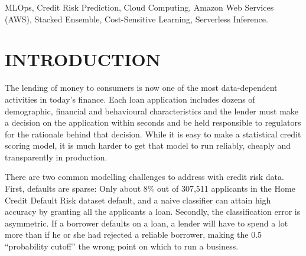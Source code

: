 \documentclass[conference]{IEEEtran}
\begin{document}
\maketitle

\begin{abstract}
Accurate credit risk models are easy to build offline, but real-world lending also demands cost-aware decisions, real-time feature reconstruction and full audit traceability. This paper presents CreditIQ, an end-to-end credit risk prediction platform built on Amazon Web Services (AWS) and evaluated on the Home Credit Default Risk dataset. Raw data is stored in Amazon S3, explored with Amazon Athena and preprocessed by AWS Glue under AWS Step Functions orchestration. A stacked ensemble of Logistic Regression, Random Forest, XGBoost and LightGBM achieves a held-out ROC-AUC of 0.7556, and a business cost matrix that penalises false approvals far more than false rejections sets its decision threshold at 0.49. The model is hosted on an Amazon SageMaker serverless endpoint, served through Amazon CloudFront, API Gateway and AWS Lambda, and every decision is logged to Amazon DynamoDB under AWS IAM and Amazon CloudWatch governance. The cloud deployment exactly matched the predictions of the local baseline, achieved 100\% request success rate, and had a median server-side latency of just 27 ms --- a realistic example of cost-aware financial MLOps.
\end{abstract}

\begin{IEEEkeywords}
MLOps, Credit Risk Prediction, Cloud Computing, Amazon Web Services (AWS), Stacked Ensemble, Cost-Sensitive Learning, Serverless Inference.
\end{IEEEkeywords}

\section{INTRODUCTION}
The lending of money to consumers is now one of the most data-dependent activities in today's finance. Each loan application includes dozens of demographic, financial and behavioural characteristics and the lender must make a decision on the application within seconds and be held responsible to regulators for the rationale behind that decision. While it is easy to make a statistical credit scoring model, it is much harder to get that model to run reliably, cheaply and transparently in production.

There are two common modelling challenges to address with credit risk data. First, defaults are sparse: Only about 8\% out of 307,511 applicants in the Home Credit Default Risk dataset default, and a naive classifier can attain high accuracy by granting all the applicants a loan. Secondly, the classification error is asymmetric. If a borrower defaults on a loan, a lender will have to spend a lot more than if he or she had rejected a reliable borrower, making the 0.5 ``probability cutoff'' the wrong point on which to run a business.
\end{document}
